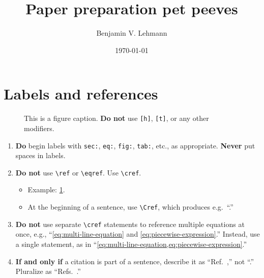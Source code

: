 \documentclass[
    prd, superscriptaddress, nofootinbib, amsmath, amssymb,
    aps, floatfix, preprintnumbers
]{revtex4-2}
\newcommand{\refcite}[1]{Ref.~\cite{#1}}
\newcommand{\refscite}[1]{Refs.~\cite{#1}}
\begin{document}
\title{Paper preparation pet peeves}
 
\author{Benjamin V. Lehmann}

\date\today


\begin{abstract}\ignorespaces{}
\end{abstract}

\maketitle

\section{Labels and references}
\label{sec:labels-and-references}
\begin{figure}\centering
    \caption{This is a figure caption. \textbf{Do not} use \texttt{[h]}, \texttt{[t]}, or any other modifiers.}
    \label{fig:my-figure}
\end{figure}
\begin{enumerate}
    \item \textbf{Do} begin labels with \texttt{sec:}, \texttt{eq:}, \texttt{fig:}, \texttt{tab:}, etc., as appropriate. \textbf{Never} put spaces in labels.
    \item \textbf{Do not} use \verb|\ref| or \verb|\eqref|. Use \verb|\cref|. 
        \begin{itemize}
            \item Example: \cref{fig:my-figure}.
            \item At the beginning of a sentence, use \verb|\Cref|, which produces e.g.\ ``.''
        \end{itemize}
    \item \textbf{Do not} use separate \verb|\cref| statements to reference multiple equations at once, e.g., ``\cref{eq:multi-line-equation} and \cref{eq:piecewise-expression}.'' Instead, use a single statement, as in ``\cref{eq:multi-line-equation,eq:piecewise-expression}.''
    \item \textbf{If and only if} a citation is part of a sentence, describe it as ``\refcite{Essig:2011nj},'' not ``\cite{Essig:2011nj}.'' Pluralize as ``\refscite{Essig:2011nj,Chandrasekhar:1942}.''
\end{enumerate}
\end{document}
